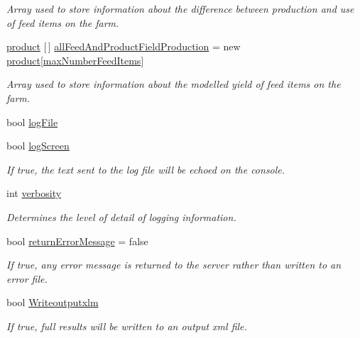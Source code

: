 \begin{DoxyCompactItemize}
\begin{DoxyCompactList}\small\item\em Array used to store information about the difference between production and use of feed items on the farm. \end{DoxyCompactList}\item 
\mbox{\hyperlink{class_global_vars_1_1product}{product}} \mbox{[}$\,$\mbox{]} \mbox{\hyperlink{class_global_vars_aa1c5d78bdc0b4d2f03b806a5008b94cd}{all\+Feed\+And\+Product\+Field\+Production}} = new \mbox{\hyperlink{class_global_vars_1_1product}{product}}\mbox{[}\mbox{\hyperlink{class_global_vars_a42fa58d4be2a863e36b4ec8e8bee69cd}{max\+Number\+Feed\+Items}}\mbox{]}
\begin{DoxyCompactList}\small\item\em Array used to store information about the modelled yield of feed items on the farm. \end{DoxyCompactList}\item 
bool \mbox{\hyperlink{class_global_vars_a73f53602205df5b31fae5ba35cde7f0c}{log\+File}}
\item 
bool \mbox{\hyperlink{class_global_vars_a595268838a351f8166bbf37c837cdec6}{log\+Screen}}
\begin{DoxyCompactList}\small\item\em If true, the text sent to the log file will be echoed on the console. \end{DoxyCompactList}\item 
int \mbox{\hyperlink{class_global_vars_a06d3ac318354fb94dfeeb78256f56217}{verbosity}}
\begin{DoxyCompactList}\small\item\em Determines the level of detail of logging information. \end{DoxyCompactList}\item 
bool \mbox{\hyperlink{class_global_vars_ac7a516010a3ce81e1fc2792807bb305d}{return\+Error\+Message}} = false
\begin{DoxyCompactList}\small\item\em If true, any error message is returned to the server rather than written to an error file. \end{DoxyCompactList}\item 
bool \mbox{\hyperlink{class_global_vars_a863dc1126b2e5bf517e26a45cf069fbb}{Writeoutputxlm}}
\begin{DoxyCompactList}\small\item\em If true, full results will be written to an output xml file. \end{DoxyCompactList}\item 

\end{DoxyCompactItemize}
